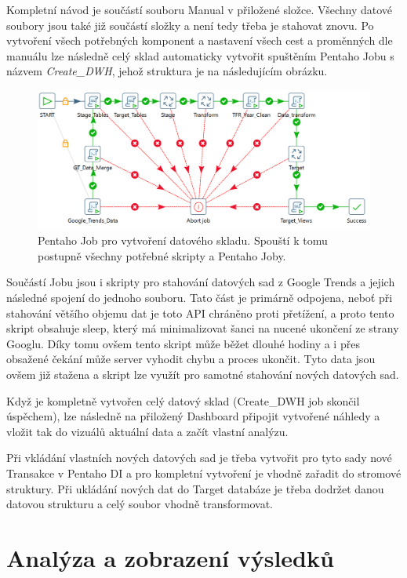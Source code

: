 \documentclass[thesis=M,czech]{FITthesis}[2022/10/08]
\begin{document}
Kompletní návod je součástí souboru Manual v přiložené složce. Všechny datové soubory jsou také již součástí složky a není tedy třeba je stahovat znovu. Po vytvoření všech potřebných komponent a nastavení všech cest a proměnných dle manuálu lze následně celý sklad automaticky vytvořit spuštěním Pentaho Jobu s názvem \textit{Create\_DWH}, jehož struktura je na následujícím obrázku.

\begin{figure}
    \centering
    \includegraphics[width=\textwidth]{DP-obrazky/Create_DWH.png}
    \caption{Pentaho Job pro vytvoření datového skladu. Spouští k tomu postupně všechny potřebné skripty a Pentaho Joby.}
    \label{fig:Create_DWH_ETL}
\end{figure}

Součástí Jobu jsou i skripty pro stahování datových sad z Google Trends a jejich následné spojení do jednoho souboru. Tato část je primárně odpojena, neboť při stahování většího objemu dat je toto API chráněno proti přetížení, a proto tento skript obsahuje sleep, který má minimalizovat šanci na nucené ukončení ze strany Googlu. Díky tomu ovšem tento skript může běžet dlouhé hodiny a i přes obsažené čekání může server vyhodit chybu a proces ukončit. Tyto data jsou ovšem již stažena a skript lze využít pro samotné stahování nových datových sad.

Když je kompletně vytvořen celý datový sklad (Create\_DWH job skončil úspěchem), lze následně na přiložený Dashboard připojit vytvořené náhledy a vložit tak do vizuálů aktuální data a začít vlastní analýzu.

Při vkládání vlastních nových datových sad je třeba vytvořit pro tyto sady nové Transakce v Pentaho DI a pro kompletní vytvoření je vhodně zařadit do stromové struktury. Při ukládání nových dat do Target databáze je třeba dodržet danou datovou strukturu a celý soubor vhodně transformovat.

\chapter{Analýza a zobrazení výsledků}
\end{document}
